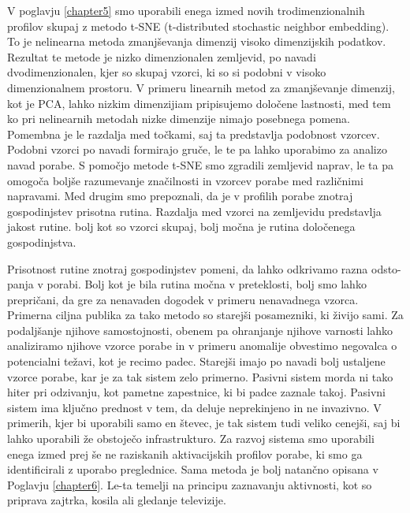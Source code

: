 \begin{sloabstract}
V poglavju \ref{chapter5} smo uporabili enega izmed novih trodimenzionalnih profilov skupaj z metodo t-SNE (t-distributed stochastic neighbor embedding). To je nelinearna metoda zmanjševanja dimenzij visoko dimenzijskih podatkov. Rezultat te metode je nizko dimenzionalen zemljevid, po navadi dvodimenzionalen, kjer so skupaj vzorci, ki so si podobni v visoko dimenzionalnem prostoru. V primeru linearnih metod za zmanjševanje dimenzij, kot je PCA, lahko nizkim dimenzijiam pripisujemo določene lastnosti, med tem ko pri nelinearnih metodah nizke dimenzije nimajo posebnega pomena. Pomembna je le razdalja med točkami, saj ta predstavlja podobnost vzorcev. Podobni vzorci po navadi formirajo gruče, le te pa lahko uporabimo za analizo navad porabe. S pomočjo metode t-SNE smo zgradili zemljevid naprav, le ta pa omogoča boljše razumevanje značilnosti in vzorcev porabe med različnimi napravami. Med drugim smo prepoznali, da je v profilih porabe znotraj gospodinjstev prisotna rutina. Razdalja med vzorci na zemljevidu predstavlja jakost rutine. bolj kot so vzorci skupaj, bolj močna je rutina določenega gospodinjstva. 

Prisotnost rutine znotraj gospodinjstev pomeni, da lahko odkrivamo razna odsto-panja v porabi. Bolj kot je bila rutina močna v preteklosti, bolj smo lahko prepričani, da gre za nenavaden dogodek v primeru nenavadnega vzorca. Primerna ciljna publika za tako metodo so starejši posamezniki, ki živijo sami. Za podaljšanje njihove samostojnosti, obenem pa ohranjanje njihove varnosti lahko analiziramo njihove vzorce porabe in v primeru anomalije obvestimo negovalca o potencialni težavi, kot je recimo padec. Starejši imajo po navadi bolj ustaljene vzorce porabe, kar je za tak sistem zelo primerno. Pasivni sistem morda ni tako hiter pri odzivanju, kot pametne zapestnice, ki bi padce zaznale takoj. Pasivni sistem ima ključno prednost v tem, da deluje neprekinjeno in ne invazivno. V primerih, kjer bi uporabili samo en števec, je tak sistem tudi veliko cenejši, saj bi lahko uporabili že obstoječo infrastrukturo. Za razvoj sistema smo uporabili enega izmed prej še ne raziskanih aktivacijskih profilov porabe, ki smo ga identificirali z uporabo preglednice. Sama metoda je bolj natančno opisana v Poglavju \ref{chapter6}. Le-ta temelji na principu zaznavanju aktivnosti, kot so priprava zajtrka, kosila ali gledanje televizije.  


\end{sloabstract}
